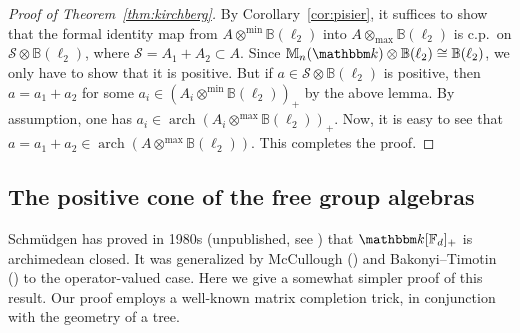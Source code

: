 \documentclass[12pt]{amsart}
\theoremstyle{definition}
\begin{document}
\begin{proof}[Proof of Theorem~\ref{thm:kirchberg}]
By Corollary~\ref{cor:pisier}, it suffices to show that
the formal identity map from $A\otimes^{\min}{{\mathbb B}}(\ell_2)$
into $A\otimes_{\max}{{\mathbb B}}(\ell_2)$ is c.p.\ on ${{\mathcal S}}\otimes{{\mathbb B}}(\ell_2)$,
where ${{\mathcal S}}=A_1+A_2\subset A$.
Since ${{\mathbb M}}_n({{\mathbbm k}})\otimes{{\mathbb B}}(\ell_2)\cong{{\mathbb B}}(\ell_2)$, we only have to
show that it is positive.
But if $a\in {{\mathcal S}}\otimes{{\mathbb B}}(\ell_2)$ is positive,
then $a=a_1+a_2$ for some $a_i\in (A_i\otimes^{\min}{{\mathbb B}}(\ell_2))_+$
by the above lemma.
By assumption, one has $a_i\in\operatorname*{arch}(A_i\otimes^{\max}{{\mathbb B}}(\ell_2))_+$.
Now, it is easy to see that $a=a_1+a_2\in\operatorname*{arch}(A\otimes^{\max}{{\mathbb B}}(\ell_2))$.
This completes the proof.
\end{proof}
\subsection{The positive cone of the free group algebras}
Schm\"udgen has proved in 1980s (unpublished, see \cite{nt}) that ${{\mathbbm k}}[{{\mathbb F}}_d]_+$ is
archimedean closed. It was generalized by McCullough (\cite{mccullough}) and
Bakonyi--Timotin (\cite{bt}) to the operator-valued case. Here we give a somewhat
simpler proof of this result. Our proof employs a well-known matrix completion trick,
in conjunction with the geometry of a tree.
\end{document}
